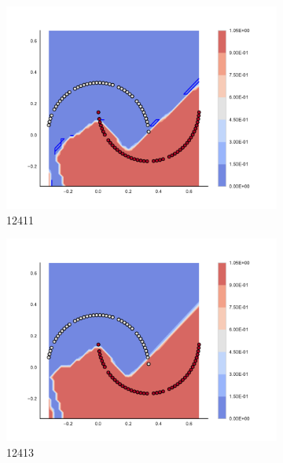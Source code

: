 \begin{figure}[h]
\begin{subfigure}[b]{0.09\textwidth}
    \includegraphics[clip, trim=2.35cm 1.75cm 4.5cm 0cm,width=\textwidth]{img/convergence/12411.pdf}
    \caption{12411}
    \label{fig:convergence_12411}
\end{subfigure}
%
\begin{subfigure}[b]{0.09\textwidth}
    \includegraphics[clip, trim=2.35cm 1.75cm 4.5cm 0cm,width=\textwidth]{img/convergence/12413.pdf}
    \caption{12413}
    \label{fig:convergence_12413}
\end{subfigure}
%
\begin{subfigure}[b]{0.09\textwidth}

\end{subfigure}
\end{figure}
